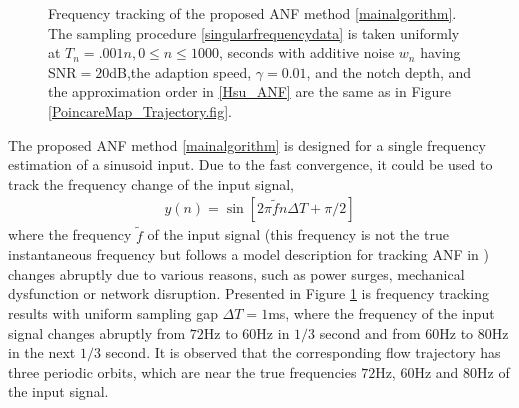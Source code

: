 \documentclass{UCF_ETD}
\begin{document}
\begin{figure}[H]
\begin{center}
  \caption{Frequency tracking  of the proposed ANF method
  \eqref{mainalgorithm}.
  The sampling  procedure
  \eqref{singularfrequencydata} is taken uniformly at   $T_n=.001 n, 0\le n\le 1000$, seconds
  with additive noise $w_n$ having SNR$=20$dB,the adaption speed, $\gamma = 0.01$,
   and   the  notch  depth,  and the approximation order in \eqref{Hsu_ANF} are the same as in
    Figure \ref{PoincareMap_Trajectory.fig}.
   }
  \label{3d_2d_Hops.fig}
  \end{center}
  \end{figure}
  
The proposed ANF method \eqref{mainalgorithm} is designed for a single
frequency estimation of a sinusoid input.
Due to the fast convergence, it could be used
to track the frequency change of the input signal, 
\begin{eqnarray} \label{TimeVaryingSignalModel}
y(n)=  \sin [2\pi \tilde{f} n\Delta T +\pi/2]
\end{eqnarray}
where the frequency $\tilde{f}$ of the input signal (this frequency is not the true instantaneous frequency but follows a model description for tracking ANF in \cite{tanjiang09}) changes abruptly due to various  reasons, such as power surges, mechanical dysfunction or network disruption.  %
Presented in Figure \ref{3d_2d_Hops.fig}
is frequency tracking results with uniform sampling gap $\Delta T = 1$ms,
where  the frequency of the input signal
changes abruptly  from 
 $72$Hz to $60$Hz in $1/3$ second and from $60$Hz to $80$Hz in the next $1/3$ second.
 It is observed  that the corresponding flow trajectory has three periodic orbits, which are
near the true frequencies $72$Hz, $60$Hz and $80$Hz of the input signal.
\end{document}
